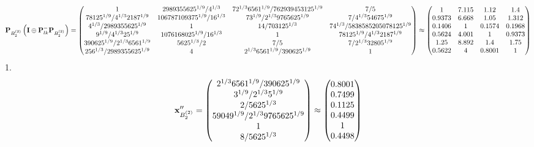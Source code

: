 \documentclass[10pt,a4paper]{article}
\begin{document}
	\[
		\bold{P}_{B_2^{(2)}}\left(\bold{I} \oplus \bold{P}_{lk}^{-}\bold{P}_{B_2^{(2)}}\right) = 
		\begin{pmatrix}
			{1}{} & {{2989355625^ {1 / 9}}} / {{4^ {1 / 3}}} & {{7}{2^ {1 / 3}}{6561^ {1 / 9}}} / {{762939453125^ {1 / 9}}} & {{7}} / {{5}} \\
			{{78125^ {1 / 9}}} / {{4^ {1 / 3}}{2187^ {1 / 9}}} & {{106787109375^ {1 / 9}}} / {{16^ {1 / 3}}} & {{7}{3^ {1 / 9}}} / {{2^ {1 / 3}}{9765625^ {1 / 9}}} & {{7}} / {{4^ {1 / 3}}{54675^ {1 / 9}}} \\
			{{4^ {1 / 3}}} / {{2989355625^ {1 / 9}}} & {1}{} & {{14}} / {{703125^ {1 / 3}}} & {{7}{4^ {1 / 3}}} / {{5838585205078125^ {1 / 9}}} \\
			{{9^ {1 / 9}}} / {{4^ {1 / 3}}{25^ {1 / 9}}} & {{1076168025^ {1 / 9}}} / {{16^ {1 / 3}}} & {1}{} & {{78125^ {1 / 9}}} / {{4^ {1 / 3}}{2187^ {1 / 9}}} \\
			{{390625^ {1 / 9}}} / {{2^ {1 / 3}}{6561^ {1 / 9}}} & {{5625^ {1 / 3}}} / {{2}} & {{7}} / {{5}} & {{7}} / {{2^ {1 / 3}}{32805^ {1 / 9}}} \\
			{{256^ {1 / 3}}} / {{2989355625^ {1 / 9}}} & {{4}}{} & {{2^ {1 / 3}}{6561^ {1 / 9}}} / {{390625^ {1 / 9}}} & {1}{} \\
		\end{pmatrix}
		\approx
		\begin{pmatrix}
			1        & 7.115    & 1.12     & 1.4      \\
			0.9373   & 6.668    & 1.05     & 1.312    \\
			0.1406   & 1        & 0.1574   & 0.1968   \\
			0.5624   & 4.001    & 1        & 0.9373   \\
			1.25     & 8.892    & 1.4      & 1.75     \\
			0.5622   & 4        & 0.8001   & 1        \\
		\end{pmatrix}
	\]
	1.
	\[
		\bold{x}''_{B_2^{(2)}} = 
		\begin{pmatrix}
			{{2^ {1 / 3}}{6561^ {1 / 9}}} / {{390625^ {1 / 9}}} \\
			{{3^ {1 / 9}}} / {{2^ {1 / 3}}{5^ {1 / 9}}} \\
			{{2}} / {{5625^ {1 / 3}}} \\
			{{59049^ {1 / 9}}} / {{2^ {1 / 3}}{9765625^ {1 / 9}}} \\
			{1}{} \\
			{{8}} / {{5625^ {1 / 3}}} \\
		\end{pmatrix}
		\approx
		\begin{pmatrix}
			0.8001   \\
			0.7499   \\
			0.1125   \\
			0.4499   \\
			1        \\
			0.4498   \\
		\end{pmatrix}
	\]
\end{document}
